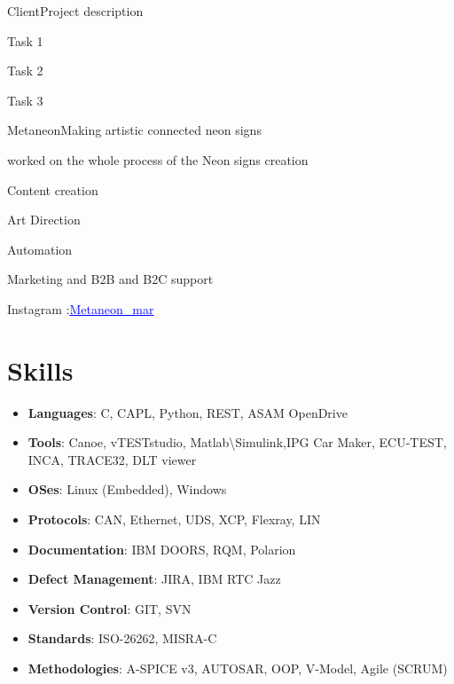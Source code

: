 \documentclass{my_cv}
\begin{document}
{Client}{Project description}{
    \item  Task 1
    \item  Task 2
      \item  Task 3




}\vspace{0.1cm}
{Metaneon}{Making artistic connected neon signs }{
    \item worked on the whole process of the Neon signs creation
    \item Content creation 
    \item Art Direction 
    \item Automation 
   \item Marketing and B2B and B2C support
   \item Instagram :\href{https://www.instagram.com/metaneon_mar/}{\textcolor{blue}{\underline{Metaneon\_mar}}}


}\vspace{0.1cm}



\vspace{-12pt}

\section{Skills}
\begin{itemize}[leftmargin=10pt, itemsep=0pt]

\item {\bf Languages}: C, CAPL, Python, REST, ASAM OpenDrive
\item {\bf Tools}: Canoe, vTESTstudio, Matlab\textbackslash Simulink,IPG Car Maker, ECU-TEST, INCA, TRACE32, DLT viewer
\item {\bf  OSes}:  Linux (Embedded), Windows
\item {\bf  Protocols}:  CAN, Ethernet, UDS, XCP, Flexray, LIN
\item {\bf Documentation}:  IBM DOORS, RQM, Polarion
\item {\bf  Defect Management}: JIRA, IBM RTC Jazz
\item {\bf   Version Control}: GIT, SVN
\item {\bf Standards}:  ISO-26262, MISRA-C
\item {\bf Methodologies}:  A-SPICE v3, AUTOSAR, OOP, V-Model, Agile (SCRUM)


\end{itemize}
\end{document}
